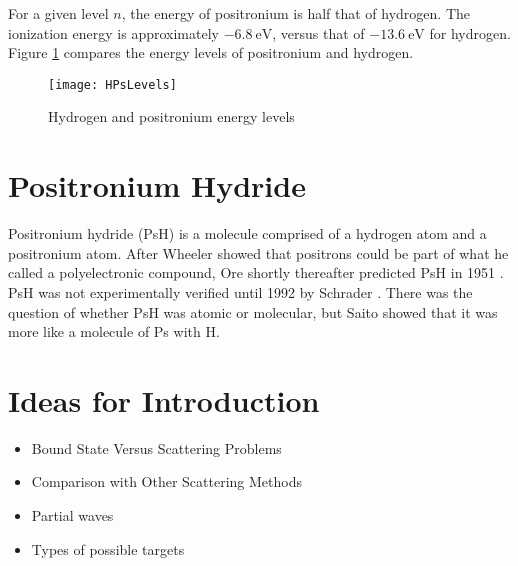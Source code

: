 \documentclass[Dissertation.tex]{subfiles}
\begin{document}
For a given level $n$, the energy of positronium is half that of hydrogen. The ionization energy is approximately $\SI{-6.8}{\eV}$, versus that of $\SI{-13.6}{\eV}$ for hydrogen. Figure \ref{fig:HPsLevels} compares the energy levels of positronium and hydrogen.
\begin{figure}[H]
	\centering
	\texttt{[image: HPsLevels]}
	\caption{Hydrogen and positronium energy levels}
	\label{fig:HPsLevels}
\end{figure}

\section{Positronium Hydride}
\label{sec:PsH}
Positronium hydride (PsH) is a molecule  comprised of a hydrogen atom and a positronium atom. After Wheeler \cite{Wheeler1946} showed that positrons could be part of what he called a polyelectronic compound, Ore shortly thereafter predicted PsH in 1951 \cite{Ore1951}. PsH was not experimentally verified until 1992 by Schrader \cite{Schrader1992}. There was the question of whether PsH was atomic or molecular, but Saito \cite{Saito2000} showed that it was more like a molecule of Ps with H.






\section{Ideas for Introduction}

\begin{itemize}
	\item Bound State Versus Scattering Problems
	\item Comparison with Other Scattering Methods
	\item Partial waves
	\item Types of possible targets
\end{itemize}

\end{document}
